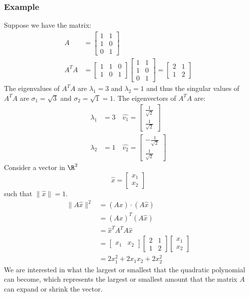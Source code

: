 \documentclass{math}
\begin{document}
\subsubsection*{Example}
Suppose we have the matrix:
\begin{align*}
  A &= \begin{bmatrix}
    1 & 1 \\
    1 & 0 \\
    0 & 1
  \end{bmatrix} \\
  A^TA &= \begin{bmatrix}
    1 & 1 & 0 \\
    1 & 0 & 1
  \end{bmatrix}\begin{bmatrix}
    1 & 1 \\
    1 & 0 \\
    0 & 1
  \end{bmatrix} = \begin{bmatrix}
    2 & 1 \\
    1 & 2
  \end{bmatrix}
\end{align*}
The eigenvalues of \( A^TA \) are \( \lambda_1 = 3 \) and \( \lambda_2 = 1 \)
and thus the singular values of \( A^TA \) are \( \sigma_1 = \sqrt{3} \) and
\( \sigma_2 = \sqrt{1} = 1 \). The eigenvectors of \( A^TA \) are:
\begin{align*}
  \lambda_1 &= 3 \quad \hat{v_1} = \begin{bmatrix}
    \frac{1}{\sqrt{2}} \\ \frac{1}{\sqrt{2}}
  \end{bmatrix} \\
  \lambda_2 &= 1 \quad \hat{v_2} = \begin{bmatrix}
    -\frac{1}{\sqrt{2}} \\ \frac{1}{\sqrt{2}}
  \end{bmatrix}
\end{align*}
Consider a vector in \( \R^2 \)
\[ \hat{x} = \begin{bmatrix}x_1 \\ x_2\end{bmatrix} \]
such that \( \|\hat{x}\| = 1 \).
\begin{align*}
  \|A\hat{x}\|^2 &= (A\hat{x})\cdot(A\hat{x}) \\
  &= (A\hat{x})^T(A\hat{x}) \\
  &= \hat{x}^TA^TA\hat{x} \\
  &= \begin{bmatrix}x_1 & x_2\end{bmatrix}
    \begin{bmatrix}2 & 1 \\ 1 & 2\end{bmatrix}
    \begin{bmatrix}x_1 \\ x_2\end{bmatrix} \\
  &= 2x_1^2+2x_1x_2+2x_2^2
\end{align*}
We are interested in what the largest or smallest that the quadratic
polynomial can become, which represents the largest or smallest amount that the
matrix \( A \) can expand or shrink the vector.
\end{document}
